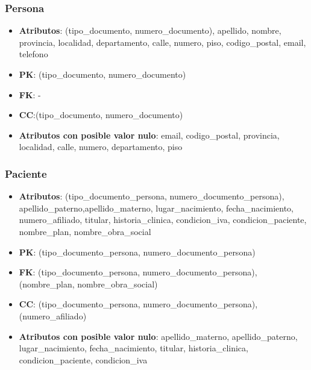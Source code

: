 \documentclass[a4paper,11pt]{article}
\begin{document}
\subsubsection{\textbf{Persona}}

\begin{itemize}

\item 
\textbf{Atributos}: (tipo\_documento, numero\_documento), apellido, nombre, provincia, localidad, departamento, calle, numero, piso, codigo\_postal, email, telefono

\item 
\textbf{PK}: (tipo\_documento, numero\_documento)

\item
\textbf{FK}: -

\item 
\textbf{CC}:(tipo\_documento, numero\_documento)

\item 
\textbf{Atributos con posible valor nulo}: email, codigo\_postal, provincia, localidad, calle, numero, departamento, piso	
\end{itemize}

\subsubsection{\textbf{Paciente}}

\begin{itemize}

\item 
\textbf{Atributos}: (tipo\_documento\_persona, numero\_documento\_persona), apellido\_paterno,apellido\_materno, lugar\_nacimiento, fecha\_nacimiento,  numero\_afiliado, titular, historia\_clinica, condicion\_iva, condicion\_paciente, nombre\_plan, nombre\_obra\_social

\item 
\textbf{PK}: (tipo\_documento\_persona, numero\_documento\_persona)

\item
\textbf{FK}:  (tipo\_documento\_persona, numero\_documento\_persona), (nombre\_plan, nombre\_obra\_social)

\item 
\textbf{CC}: (tipo\_documento\_persona, numero\_documento\_persona), (numero\_afiliado)

\item 
\textbf{Atributos con posible valor nulo}:  apellido\_materno, apellido\_paterno, lugar\_nacimiento, fecha\_nacimiento, titular, historia\_clinica, condicion\_paciente, condicion\_iva

\end{itemize}
\end{document}
